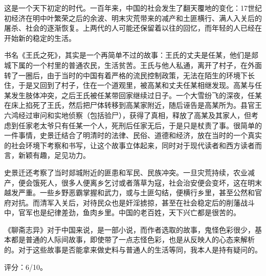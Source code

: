 这是一个天下初定的时代。一百年来，中国的社会发生了翻天覆地的变化：17世纪初经济在明中叶繁荣之后的余波、明末灾荒带来的减产和土匪横行、满人入关后的屠杀、社会的逐渐恢复。上两代的人可能还保留着以往的回忆，而年轻的人已经在开始新的稳定的生活。

书名《王氏之死》，其实是一个再简单不过的故事：王氏的丈夫是任某，他们是郯城下属的一个村里的普通农民，生活贫苦。王氏与他人私通，离开了村子，在外面转了一圈后，由于当时的中国有着严格的流民控制政策，无法在陌生的环境下长住，于是又回到了村子，住在一个道观里，被高某和丈夫任某相继发现。高某与任某发生肢体冲突，之后王氏被任某带回家继续过日子。一个大雪纷飞的深夜，任某在床上掐死了王氏，然后把尸体转移到高某家附近，随后诬告是高某所为。县官王六鸿经过审问和实地侦察（包括验尸），获得了真相，释放了高某及其家人，但考虑到任家老太爷只有任某一个人，死刑后任家无后，于是只是杖责了事。很简单的一件事情，史景迁结合了明清时的法律、民俗、道德和经济，放在当时的一个真实的社会环境下考察和书写，让这个故事立体起来，同时对于现代读者和西方读者而言，新颖有趣，足见功力。

史景迁还考察了当时郯城附近的匪患和军民、民族冲突。一旦灾荒持续，农业减产，便会饿死人，很多人便离乡乞讨或者落草为寇，社会治安便会变坏，这在明末越发严重。一些乡野恶霸掌握和武力，或与土匪勾结，便横行乡里，甚至公然和官府对抗。而清军入关后，对待民众也是奸淫掳掠，甚至在社会稳定后的削藩战斗中，官军也是纪律差劲，鱼肉乡里。中国的老百姓，天下兴亡都是很苦的。

《聊斋志异》对于中国来说，是一部小说，而作者选取的故事，鬼怪色彩很少，基本都是普通的人际间故事，即使带了一点志怪色彩，也是从反映人的心态来解析的。对于这些故事是否能拿来做史料与普通人的生活等同，我本人是持有疑问的。

评分：6/10。






